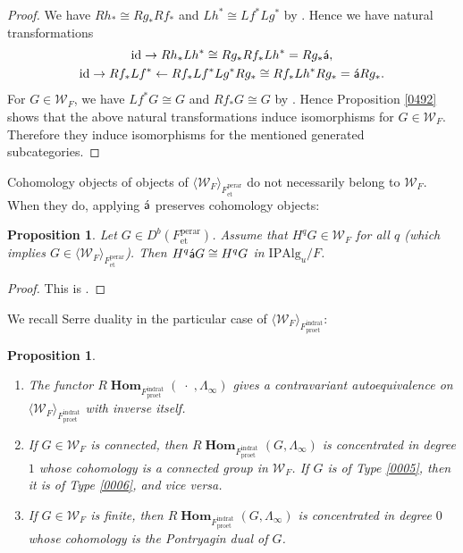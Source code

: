 \documentclass{amsart}
\newtheorem{Prop}[Thm]{Proposition}
\theoremstyle{remark}
\numberwithin{equation}{subsection}
\newcommand{\et}{\mathrm{et}}
\newcommand{\id}{\mathrm{id}}
\newcommand{\rat}{\mathrm{rat}}
\newcommand{\ind}{\mathrm{ind}}
\newcommand{\pro}{\mathrm{pro}}
\newcommand{\perar}{\mathrm{perar}}
\newcommand{\Alg}{\mathrm{Alg}}
\newcommand{\Ind}{\mathrm{I}}
\newcommand{\Pro}{\mathrm{P}}
\newcommand{\alg}[1]{\mathbf{#1}}
\newcommand{\var}{\;\cdot\;}
\newcommand{\algebrize}{\Acute{\mathsf{a}}}
\newcommand{\genby}[1]{\langle #1 \rangle}
\DeclareMathOperator{\sheafhom}{\alg{Hom}}
\begin{document}
\begin{proof}
	We have $R h_{\ast} \cong R g_{\ast} R f_{\ast} $
	and $L h^{\ast} \cong L f^{\ast} L g^{\ast}$
	by \cite[Proposition 2.6]{Suz21}.
	Hence we have natural transformations
		\begin{gather*}
					\id
				\to
					R h_{\ast} L h^{\ast}
				\cong
					R g_{\ast} R f_{\ast} L h^{\ast}
				=
					R g_{\ast} \algebrize,
			\\
					\id
				\to
					R f_{\ast} L f^{\ast}
				\gets
					R f_{\ast} L f^{\ast} L g^{\ast} R g_{\ast}
				\cong
					R f_{\ast} L h^{\ast} R g_{\ast}
				=
					\algebrize R g_{\ast}.
		\end{gather*}
	For $G \in \mathcal{W}_{F}$, we have $L f^{\ast} G \cong G$ and $R f_{\ast} G \cong G$
	by \cite[Proposition 7.6]{Suz21}.
	Hence Proposition \ref{0492} shows that
	the above natural transformations induce isomorphisms for $G \in \mathcal{W}_{F}$.
	Therefore they induce isomorphisms for the mentioned generated subcategories.
\end{proof}

Cohomology objects of objects of $\genby{\mathcal{W}_{F}}_{F^{\perar}_{\et}}$
do not necessarily belong to $\mathcal{W}_{F}$.
When they do, applying $\algebrize$ preserves cohomology objects:

\begin{Prop} \label{0501}
	Let $G \in D^{b}(F^{\perar}_{\et})$.
	Assume that $H^{q} G \in \mathcal{W}_{F}$ for all $q$
	(which implies $G \in \genby{\mathcal{W}_{F}}_{F^{\perar}_{\et}}$).
	Then $H^{q} \algebrize G \cong H^{q} G$ in $\Ind \Pro \Alg_{u} / F$.
\end{Prop}

\begin{proof}
	This is \cite[Proposition 7.9 (b)]{Suz21}.
\end{proof}

We recall Serre duality in the particular case of $\genby{\mathcal{W}_{F}}_{F^{\ind\rat}_{\pro\et}}$:

\begin{Prop} \mbox{} \label{0008}
	\begin{enumerate}
		\item
			The functor $R \sheafhom_{F^{\ind\rat}_{\pro\et}}(\var, \Lambda_{\infty})$
			gives a contravariant autoequivalence on
			$\genby{\mathcal{W}_{F}}_{F^{\ind\rat}_{\pro\et}}$
			with inverse itself.
		\item
			If $G \in \mathcal{W}_{F}$ is connected,
			then $R \sheafhom_{F^{\ind\rat}_{\pro\et}}(G, \Lambda_{\infty})$ is concentrated in degree $1$
			whose cohomology is a connected group in $\mathcal{W}_{F}$.
			If $G$ is of Type \eqref{0005},
			then it is of Type \eqref{0006},
			and vice versa.
		\item
			If $G \in \mathcal{W}_{F}$ is finite,
			then $R \sheafhom_{F^{\ind\rat}_{\pro\et}}(G, \Lambda_{\infty})$ is concentrated in degree $0$
			whose cohomology is the Pontryagin dual of $G$.
	\end{enumerate}
\end{Prop}
\end{document}
